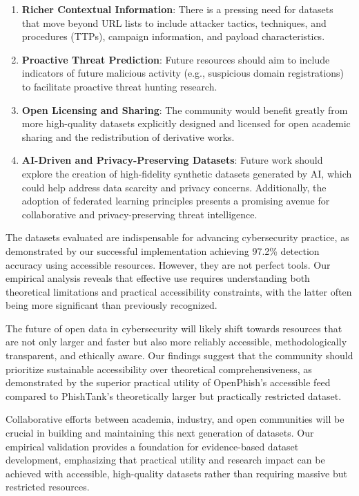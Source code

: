 \documentclass[journal,article,submit,pdftex,moreauthors]{Definitions/mdpi}
\begin{document}
\begin{enumerate}
\item \textbf{Richer Contextual Information}: There is a pressing need for datasets that move beyond URL lists to include attacker tactics, techniques, and procedures (TTPs), campaign information, and payload characteristics.
\item \textbf{Proactive Threat Prediction}: Future resources should aim to include indicators of future malicious activity (e.g., suspicious domain registrations) to facilitate proactive threat hunting research.
\item \textbf{Open Licensing and Sharing}: The community would benefit greatly from more high-quality datasets explicitly designed and licensed for open academic sharing and the redistribution of derivative works.
\item \textbf{AI-Driven and Privacy-Preserving Datasets}: Future work should explore the creation of high-fidelity synthetic datasets generated by AI, which could help address data scarcity and privacy concerns. Additionally, the adoption of federated learning principles presents a promising avenue for collaborative and privacy-preserving threat intelligence.
\end{enumerate}

The datasets evaluated are indispensable for advancing cybersecurity practice, as demonstrated by our successful implementation achieving 97.2\% detection accuracy using accessible resources. However, they are not perfect tools. Our empirical analysis reveals that effective use requires understanding both theoretical limitations and practical accessibility constraints, with the latter often being more significant than previously recognized.

The future of open data in cybersecurity will likely shift towards resources that are not only larger and faster but also more reliably accessible, methodologically transparent, and ethically aware. Our findings suggest that the community should prioritize sustainable accessibility over theoretical comprehensiveness, as demonstrated by the superior practical utility of OpenPhish's accessible feed compared to PhishTank's theoretically larger but practically restricted dataset.

Collaborative efforts between academia, industry, and open communities will be crucial in building and maintaining this next generation of datasets. Our empirical validation provides a foundation for evidence-based dataset development, emphasizing that practical utility and research impact can be achieved with accessible, high-quality datasets rather than requiring massive but restricted resources.
\end{document}
